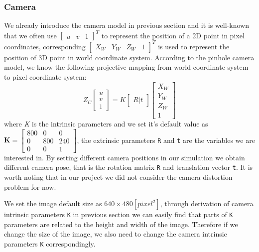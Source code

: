   
\subsubsection{Camera}
We already introduce the camera model in previous section and it is well-known that we often use 
$\begin{bmatrix}
u & v & 1
\end{bmatrix}^T$ to represent the position of a 2D point in pixel coordinates, corresponding 
$\begin{bmatrix}
X_W & Y_W & Z_W & 1
\end{bmatrix}^T$ is used to represent the position of 3D point in world coordinate system. According to the pinhole camera model, we know the following projective mapping from world coordinate system to pixel coordinate system:
\begin{equation}
Z_C \begin{bmatrix} u \\ v \\ 1 \end{bmatrix}
      = K 
        \begin{bmatrix} R | t \end{bmatrix}                                          
        \begin{bmatrix} X_W \\ Y_W \\ Z_W \\ 1 \end{bmatrix}
\end{equation}
where \textit{K} is the intrinsic parameters and we set it's default value as
$\mathbf{K} = \begin{bmatrix} 800 & 0 & 0\\
                 0 & 800 & 240\\
                 0 & 0 &1\end{bmatrix}$, the extrinsic parameters \texttt{R} and \texttt{t} are the variables we are interested in. By setting different camera positions in our simulation we obtain different camera pose, that is the rotation matrix \texttt{R} and translation vector \texttt{t}. It is worth noting that in our project we did not consider the camera distortion problem for now. 

We set the image default size as $\mathit{640 \times 480[pixel^2]}$, through derivation of camera intrinsic parameters \texttt{K} in previous section we can easily find that parts of \texttt{K} parameters are related to the height and width of the image. Therefore if we change the size of the image, we also need to change the camera intrinsic parameters \texttt{K} correspondingly.   
 
